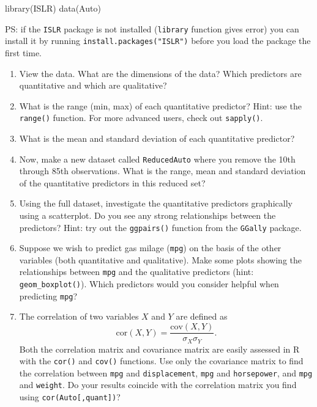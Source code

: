 \documentclass[
]{article}
\newenvironment{Shaded}{\begin{snugshade}}{\end{snugshade}}
\newcommand{\FunctionTok}[1]{\textcolor[rgb]{0.00,0.00,0.00}{#1}}
\newcommand{\NormalTok}[1]{#1}
\begin{document}
\begin{Shaded}
\begin{Highlighting}[]
\FunctionTok{library}\NormalTok{(ISLR)}
\FunctionTok{data}\NormalTok{(Auto)}
\end{Highlighting}
\end{Shaded}

PS: if the \texttt{ISLR} package is not installed (\texttt{library}
function gives error) you can install it by running
\texttt{install.packages("ISLR")} before you load the package the first
time.

\begin{enumerate}
\def\labelenumi{\alph{enumi})}
\item
  View the data. What are the dimensions of the data? Which predictors
  are quantitative and which are qualitative?
\item
  What is the range (min, max) of each quantitative predictor? Hint: use
  the \texttt{range()} function. For more advanced users, check out
  \texttt{sapply()}.
\item
  What is the mean and standard deviation of each quantitative
  predictor?
\item
  Now, make a new dataset called \texttt{ReducedAuto} where you remove
  the 10th through 85th observations. What is the range, mean and
  standard deviation of the quantitative predictors in this reduced set?
\item
  Using the full dataset, investigate the quantitative predictors
  graphically using a scatterplot. Do you see any strong relationships
  between the predictors? Hint: try out the \texttt{ggpairs()} function
  from the \texttt{GGally} package.
\item
  Suppose we wish to predict gas milage (\texttt{mpg}) on the basis of
  the other variables (both quantitative and qualitative). Make some
  plots showing the relationships between \texttt{mpg} and the
  qualitative predictors (hint: \texttt{geom\_boxplot()}). Which
  predictors would you consider helpful when predicting \texttt{mpg}?
\item
  The correlation of two variables \(X\) and \(Y\) are defined as
  \[ \text{cor}(X,Y) = \frac{\text{cov}(X,Y)}{\sigma_X\sigma_Y}.\] Both
  the correlation matrix and covariance matrix are easily assessed in R
  with the \texttt{cor()} and \texttt{cov()} functions. Use only the
  covariance matrix to find the correlation between \texttt{mpg} and
  \texttt{displacement}, \texttt{mpg} and \texttt{horsepower}, and
  \texttt{mpg} and \texttt{weight}. Do your results coincide with the
  correlation matrix you find using \texttt{cor(Auto{[},quant{]})}?
\end{enumerate}
\end{document}
